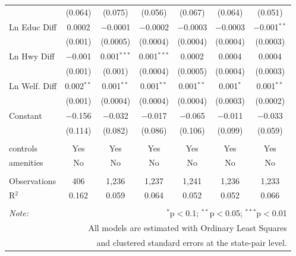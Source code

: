 \begin{table}[!htbp]
\begin{tabular}{@{\extracolsep{5pt}}lcccccc}
  & (0.064) & (0.075) & (0.056) & (0.067) & (0.064) & (0.051) \\ 
  Ln Educ Diff & 0.0002 & $-$0.0001 & $-$0.0002 & $-$0.0003 & $-$0.0003 & $-$0.001$^{**}$ \\ 
  & (0.001) & (0.0005) & (0.0004) & (0.0004) & (0.0004) & (0.0003) \\ 
  Ln Hwy Diff & $-$0.001 & 0.001$^{***}$ & 0.001$^{***}$ & 0.0002 & 0.0004 & 0.0004 \\ 
  & (0.001) & (0.001) & (0.0004) & (0.0005) & (0.0004) & (0.0003) \\ 
  Ln Welf. Diff & 0.002$^{**}$ & 0.001$^{**}$ & 0.001$^{**}$ & 0.001$^{**}$ & 0.001$^{*}$ & 0.001$^{**}$ \\ 
  & (0.001) & (0.0004) & (0.0004) & (0.0004) & (0.0003) & (0.0002) \\ 
  Constant & $-$0.156 & $-$0.032 & $-$0.017 & $-$0.065 & $-$0.011 & $-$0.033 \\ 
  & (0.114) & (0.082) & (0.086) & (0.106) & (0.099) & (0.059) \\ 
 \hline \\[-1.8ex] 
controls & Yes & Yes & Yes & Yes & Yes & Yes \\ 
amenities & No & No & No & No & No & No \\ 
\hline \\[-1.8ex] 
Observations & 406 & 1,236 & 1,237 & 1,241 & 1,236 & 1,233 \\ 
R$^{2}$ & 0.162 & 0.059 & 0.064 & 0.052 & 0.052 & 0.066 \\ 
\hline 
\hline \\[-1.8ex] 
\textit{Note:}  & \multicolumn{6}{r}{$^{*}$p$<$0.1; $^{**}$p$<$0.05; $^{***}$p$<$0.01} \\ 
 & \multicolumn{6}{r}{All models are estimated with Ordinary Least Squares} \\ 
 & \multicolumn{6}{r}{and clustered standard errors at the state-pair level.} \\ 
\end{tabular} 
\end{table} 
